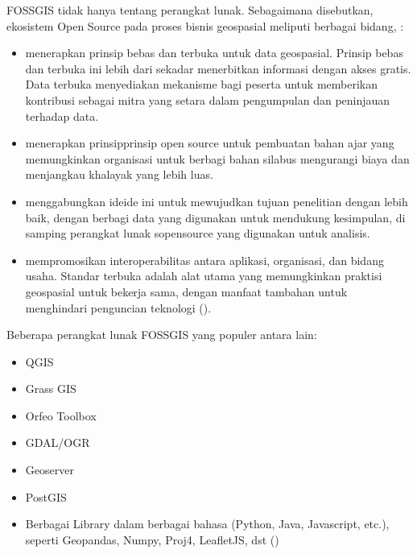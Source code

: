 \documentclass[letterpaper,10pt,english]{sphinxmanual}
\begin{document}
FOSS\sphinxhyphen{}GIS tidak hanya tentang perangkat lunak. Sebagaimana disebutkan, ekosistem Open Source pada proses bisnis geospasial meliputi berbagai bidang, :
\begin{itemize}
\item {} 
 menerapkan prinsip bebas dan terbuka untuk data geospasial. Prinsip bebas dan terbuka ini lebih dari sekadar menerbitkan informasi dengan akses gratis. Data terbuka menyediakan mekanisme bagi peserta untuk memberikan kontribusi sebagai mitra yang setara dalam pengumpulan dan peninjauan terhadap data.

\item {} 
 menerapkan prinsip\sphinxhyphen{}prinsip open source untuk pembuatan bahan ajar yang memungkinkan organisasi untuk berbagi bahan silabus mengurangi biaya dan menjangkau khalayak yang lebih luas.

\item {} 
 menggabungkan ide\sphinxhyphen{}ide ini untuk mewujudkan tujuan penelitian dengan lebih baik, dengan berbagi data yang digunakan untuk mendukung kesimpulan, di samping perangkat lunak sopensource yang digunakan untuk analisis.

\item {} 
 mempromosikan interoperabilitas antara aplikasi, organisasi, dan bidang usaha. Standar terbuka adalah alat utama yang memungkinkan praktisi geospasial untuk bekerja sama, dengan manfaat tambahan untuk menghindari penguncian teknologi ().

\end{itemize}

Beberapa perangkat lunak FOSS\sphinxhyphen{}GIS yang populer antara lain:
\begin{itemize}
\item {} 
QGIS

\item {} 
Grass GIS

\item {} 
Orfeo Toolbox

\item {} 
GDAL/OGR

\item {} 
Geoserver

\item {} 
PostGIS

\item {} 
Berbagai Library dalam berbagai bahasa (Python, Java, Javascript, etc.), seperti Geopandas, Numpy, Proj4, LeafletJS, dst ()

\end{itemize}
\end{document}
